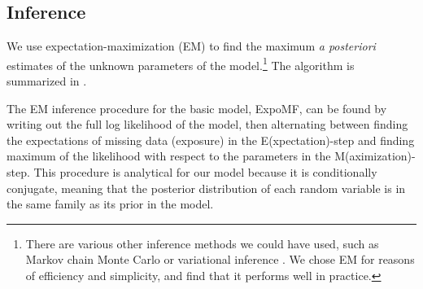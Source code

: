 

\subsection{Inference}
\label{sec:inference}
We use expectation-maximization (EM) \cite{dempster1977maximum} to find the maximum \emph{a posteriori} estimates of the unknown parameters of the model.\footnote{There are various other inference methods we could have used, such as Markov chain Monte Carlo \cite{smith1993bayesian} or variational inference \cite{wainwright2008graphical}. We chose EM for reasons of efficiency and simplicity, and find that it performs well in practice.} The algorithm is summarized in .

%
%
%
%



The EM inference procedure for the basic model, ExpoMF, 
can be found by writing out the full log likelihood of the model, 
then alternating between finding the expectations of missing data (exposure)
in the E(xpectation)-step and finding maximum of the likelihood with respect to the parameters in the M(aximization)-step. 
This procedure is analytical for our model because it is conditionally conjugate, 
meaning that the posterior distribution of each random variable 
is in the same family as its prior in the model. 

